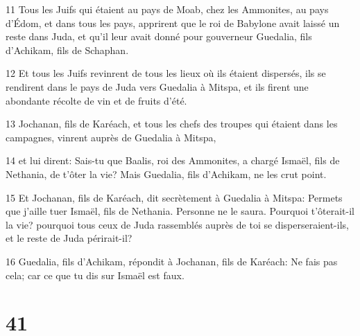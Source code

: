 \par 11 Tous les Juifs qui étaient au pays de Moab, chez les Ammonites, au pays d'Édom, et dans tous les pays, apprirent que le roi de Babylone avait laissé un reste dans Juda, et qu'il leur avait donné pour gouverneur Guedalia, fils d'Achikam, fils de Schaphan.
\par 12 Et tous les Juifs revinrent de tous les lieux où ils étaient dispersés, ils se rendirent dans le pays de Juda vers Guedalia à Mitspa, et ils firent une abondante récolte de vin et de fruits d'été.
\par 13 Jochanan, fils de Karéach, et tous les chefs des troupes qui étaient dans les campagnes, vinrent auprès de Guedalia à Mitspa,
\par 14 et lui dirent: Sais-tu que Baalis, roi des Ammonites, a chargé Ismaël, fils de Nethania, de t'ôter la vie? Mais Guedalia, fils d'Achikam, ne les crut point.
\par 15 Et Jochanan, fils de Karéach, dit secrètement à Guedalia à Mitspa: Permets que j'aille tuer Ismaël, fils de Nethania. Personne ne le saura. Pourquoi t'ôterait-il la vie? pourquoi tous ceux de Juda rassemblés auprès de toi se disperseraient-ils, et le reste de Juda périrait-il?
\par 16 Guedalia, fils d'Achikam, répondit à Jochanan, fils de Karéach: Ne fais pas cela; car ce que tu dis sur Ismaël est faux.

\chapter{41}


